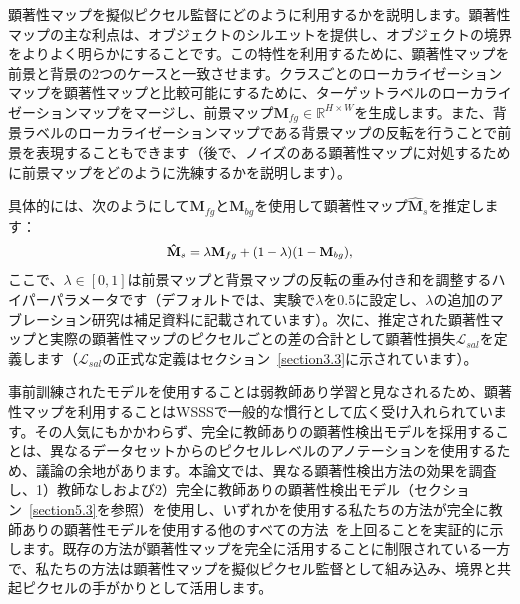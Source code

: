 \documentclass[final]{cvpr}
\begin{document}
顕著性マップを擬似ピクセル監督にどのように利用するかを説明します。顕著性マップの主な利点は、オブジェクトのシルエットを提供し、オブジェクトの境界をよりよく明らかにすることです。この特性を利用するために、顕著性マップを前景と背景の2つのケースと一致させます。クラスごとのローカライゼーションマップを顕著性マップと比較可能にするために、ターゲットラベルのローカライゼーションマップをマージし、前景マップ$\mathbf{M}_{fg} \in \mathbb{R}^{H \times W}$を生成します。また、背景ラベルのローカライゼーションマップである背景マップの反転を行うことで前景を表現することもできます（後で、ノイズのある顕著性マップに対処するために前景マップをどのように洗練するかを説明します）。

具体的には、次のようにして$\mathbf{M}_{fg}$と$\mathbf{M}_{bg}$を使用して顕著性マップ$\mathbf{\hat{M}}_{s}$を推定します：\vspace{-1mm}
\begin{equation}
\label{eq_esimate_sal}
{\small
\begin{split}
\mathbf{\hat{M}}_{s} = \lambda\mathbf{M}_{fg} + (1-\lambda)(1-\mathbf{M}_{bg}),
\end{split}}\vspace{-1mm}
\end{equation}
\noindent ここで、$\lambda \in [0, 1]$は前景マップと背景マップの反転の重み付き和を調整するハイパーパラメータです（デフォルトでは、実験で$\lambda$を0.5に設定し、$\lambda$の追加のアブレーション研究は補足資料に記載されています）。次に、推定された顕著性マップと実際の顕著性マップのピクセルごとの差の合計として顕著性損失$\mathcal{L}_{sal}$を定義します（$\mathcal{L}_{sal}$の正式な定義はセクション~\ref{section3.3}に示されています）。

事前訓練されたモデルを使用することは弱教師あり学習と見なされるため、顕著性マップを利用することはWSSSで一般的な慣行として広く受け入れられています。その人気にもかかわらず、完全に教師ありの顕著性検出モデルを採用することは、異なるデータセットからのピクセルレベルのアノテーションを使用するため、議論の余地があります。本論文では、異なる顕著性検出方法の効果を調査し、1）教師なしおよび2）完全に教師ありの顕著性検出モデル（セクション~\ref{section5.3}を参照）を使用し、いずれかを使用する私たちの方法が完全に教師ありの顕著性モデルを使用する他のすべての方法~\cite{fan2020learning,jiang2019integral,wang2018weakly, wei2016stc,yao2020saliency}を上回ることを実証的に示します。既存の方法が顕著性マップを完全に活用することに制限されている一方で、私たちの方法は顕著性マップを擬似ピクセル監督として組み込み、境界と共起ピクセルの手がかりとして活用します。
\end{document}
